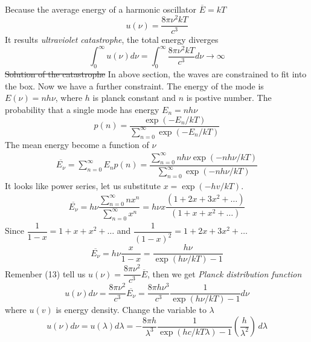 \documentclass[12pt, a4paper]{article}
\begin{document}
\begin{CJK*}{UTF8}{bsmi}
\begin{align}
\end{align}
Because the average energy of a harmonic oscillator \(\overline{E}=kT\)
\begin{equation}
    u(\nu) = \dfrac{8\pi\nu^2kT}{c^3}
\end{equation}
It results \emph{ultraviolet catastrophe}, the total energy diverges
\begin{equation}
    \int_0^\infty u(\nu)d\nu =\int_0^\infty \dfrac{8\pi\nu^2kT}{c^3}d\nu \xrightarrow{} \infty
\end{equation}
\st{Solution of the catastrophe}
In above section, the waves are constrained to fit into the box. Now we have a further constraint. The energy of the mode is \(E(\nu)=nh\nu\), where \(h\) is planck constant and \(n\) is postive number.
The probability that a single mode has energy \(E_n = nh\nu\)
\begin{equation}
    p(n) = \dfrac{\exp(-E_n/kT)}{\sum\limits_{n=0}^\infty \exp(-E_n/kT)}
\end{equation}
The mean energy become a function of \(\nu\)
\begin{align}
    \overline{E_\nu} = \sum\limits_{n=0}^\infty E_n p(n)=\dfrac{\sum\limits_{n=0}^\infty nh\nu \exp(-nh\nu/kT)}{\sum\limits_{n=0}^\infty \exp(-nh\nu/kT)}
\end{align}
It looks like power series, let us substitute \(x=\exp(-hv/kT)\).
\begin{align}
    \overline{E_\nu} =  h\nu \dfrac{\sum\limits_{n=0}^\infty nx^n}{\sum\limits_{n=0}^\infty x^n} = h\nu x\dfrac{(1+2x+3x^2+\ldots)}{(1+x+x^2+\ldots)}
\end{align}
Since \(\dfrac{1}{1-x} = 1+x+x^2+\ldots\) and \(\dfrac{1}{{(1-x)}^2}=1+2x+3x^2+\ldots\)
\begin{equation}
    \overline{E_\nu} = h\nu\dfrac{x}{1-x} =  \dfrac{h\nu}{\exp(h\nu/kT)-1}
\end{equation}
Remenber (13) tell us \(u(\nu) = \dfrac{8\pi\nu^2}{c^3}\overline{E}\), then we get \emph{Planck distribution function}
\begin{equation}
    u(\nu)d\nu = \dfrac{8\pi\nu^2}{c^3}\overline{E_\nu}= \dfrac{8\pi h\nu^3}{c^3}\dfrac{1}{\exp(h\nu/kT)-1}d\nu
\end{equation}
where \(u(v)\) is energy density. Change the variable to \(\lambda\)
\begin{equation}
    u(\nu)d\nu = u(\lambda)d\lambda = -\dfrac{8\pi h}{\lambda^3}\dfrac{1}{\exp(hc/kT\lambda)-1}(\dfrac{h}{\lambda^2})\,d\lambda
\end{equation}

\end{CJK*}
\end{document}
